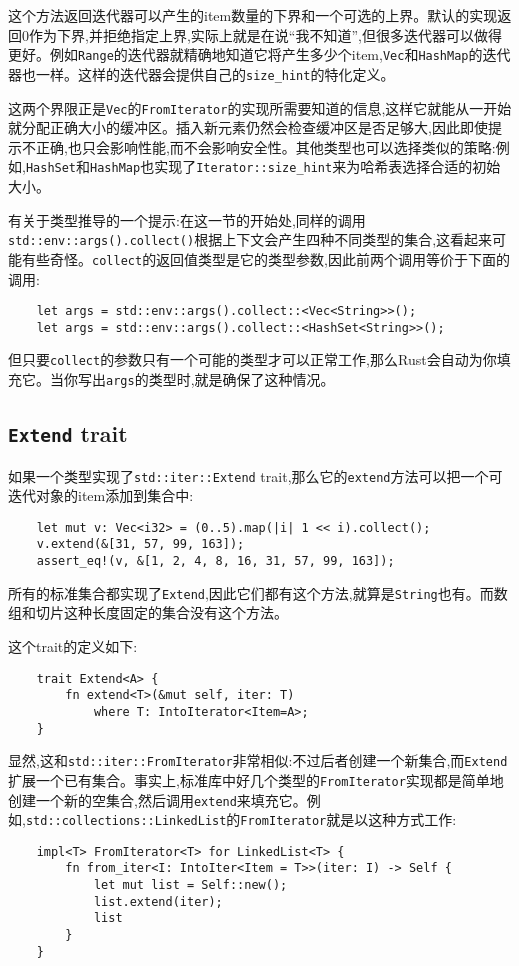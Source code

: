 这个方法返回迭代器可以产生的item数量的下界和一个可选的上界。默认的实现返回0作为下界,并拒绝指定上界,实际上就是在说“我不知道”,但很多迭代器可以做得更好。例如\texttt{Range}的迭代器就精确地知道它将产生多少个item,\texttt{Vec}和\texttt{HashMap}的迭代器也一样。这样的迭代器会提供自己的\texttt{size\_hint}的特化定义。

这两个界限正是\texttt{Vec}的\texttt{FromIterator}的实现所需要知道的信息,这样它就能从一开始就分配正确大小的缓冲区。插入新元素仍然会检查缓冲区是否足够大,因此即使提示不正确,也只会影响性能,而不会影响安全性。其他类型也可以选择类似的策略:例如,\texttt{HashSet}和\texttt{HashMap}也实现了\texttt{Iterator::size\_hint}来为哈希表选择合适的初始大小。

有关于类型推导的一个提示:在这一节的开始处,同样的调用\texttt{std::env::args().collect()}根据上下文会产生四种不同类型的集合,这看起来可能有些奇怪。\texttt{collect}的返回值类型是它的类型参数,因此前两个调用等价于下面的调用:
\begin{verbatim}
    let args = std::env::args().collect::<Vec<String>>();
    let args = std::env::args().collect::<HashSet<String>>();
\end{verbatim}

但只要\texttt{collect}的参数只有一个可能的类型才可以正常工作,那么Rust会自动为你填充它。当你写出\texttt{args}的类型时,就是确保了这种情况。

\subsection{\texttt{Extend} trait}\label{extend}
如果一个类型实现了\texttt{std::iter::Extend} trait,那么它的\texttt{extend}方法可以把一个可迭代对象的item添加到集合中:
\begin{verbatim}
    let mut v: Vec<i32> = (0..5).map(|i| 1 << i).collect();
    v.extend(&[31, 57, 99, 163]);
    assert_eq!(v, &[1, 2, 4, 8, 16, 31, 57, 99, 163]);
\end{verbatim}

所有的标准集合都实现了\texttt{Extend},因此它们都有这个方法,就算是\texttt{String}也有。而数组和切片这种长度固定的集合没有这个方法。

这个trait的定义如下:
\begin{verbatim}
    trait Extend<A> {
        fn extend<T>(&mut self, iter: T)
            where T: IntoIterator<Item=A>;
    }
\end{verbatim}
显然,这和\texttt{std::iter::FromIterator}非常相似:不过后者创建一个新集合,而\texttt{Extend}扩展一个已有集合。事实上,标准库中好几个类型的\texttt{FromIterator}实现都是简单地创建一个新的空集合,然后调用\texttt{extend}来填充它。例如,\texttt{std::collections::LinkedList}的\texttt{FromIterator}就是以这种方式工作:
\begin{verbatim}
    impl<T> FromIterator<T> for LinkedList<T> {
        fn from_iter<I: IntoIter<Item = T>>(iter: I) -> Self {
            let mut list = Self::new();
            list.extend(iter);
            list
        }
    }
\end{verbatim}

